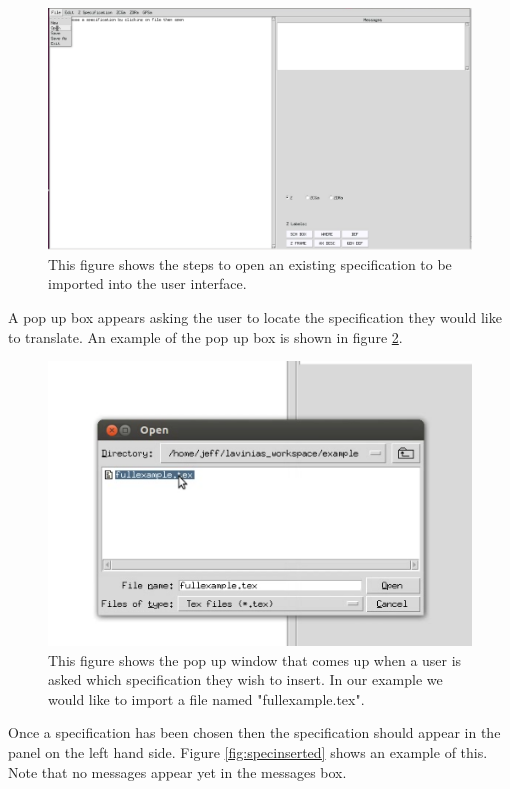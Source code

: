 \begin{figure}[H]
\includegraphics[scale=0.4]{Figures/Interface/openspec.png}
\caption{This figure shows the steps to open an existing specification to be imported into the user interface. \label{fig:openspec}}
\end{figure}

A pop up box appears asking the user to locate the specification they would like
to translate. An example of the pop up box is shown in figure
\ref{fig:choosespec}. 

\begin{figure}[H]
\includegraphics[scale=0.8]{Figures/Interface/choosespec.png}
\caption{This figure shows the pop  up  window that comes up when a user is asked which specification they wish to insert. In our example we would like to import a file named "fullexample.tex". \label{fig:choosespec}}
\end{figure}

Once a specification has been chosen then the specification should appear in the
panel on the left hand side. Figure \ref{fig:specinserted} shows an example of
this. Note that no messages appear yet in the messages box.

